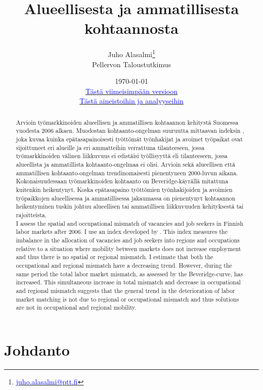 \documentclass[12pt]{article}
\title{Alueellisesta ja ammatillisesta kohtaannosta}
\date{\monthyeardate\today  \\ 
\href{https://github.com/pttry/kohtaantoindeksit/blob/main/text/kohtaantoindeksit.pdf}{\textcolor{blue}{Tästä viimeisimpään versioon}} \\
\href{https://github.com/pttry/kohtaantoindeksit}{\textcolor{blue}{Tästä aineistoihin ja analyyseihin}}}
\author{Juho Alasalmi\footnote{\href{mailto: juho.alasalmi@ptt.fi}{\textcolor{blue}{juho.alasalmi@ptt.fi}}} \\ 
Pellervon Taloustutkimus }
\begin{document}
\maketitle

\begin{abstract}
Arvioin työmarkkinoiden alueellisen ja ammatillisen kohtaannon kehitystä Suomessa vuodesta 2006 alkaen. Muodostan kohtaanto-ongelman suuruutta mittaavan indeksin \cite{csahin2014mismatch}, joka kuvaa kuinka epätasapainoisesti työttömät työnhakijat ja avoimet työpaikat ovat sijoittuneet eri alueille ja eri ammatteihin verrattuna tilanteeseen, jossa työmarkkinoiden välinen liikkuvuus ei edistäisi työllisyyttä eli tilanteeseen, jossa alueellista ja ammatillista kohtaanto-ongelmaa ei olisi. Arvioin sekä alueellisen että ammatillisen kohtaanto-ongelman trendinomaisesti pienentyneen 2000-luvun aikana. Kokonaisuudessaan työmarkkinoiden kohtaanto on Beveridge-käyrällä mitattuna kuitenkin heikentynyt. Koska epätasapaino työttömien työnhakijoiden ja avoimien työpaikkojen alueellisessa ja ammatillisessa jakaumassa on pienentynyt kohtaannon heikentyminen tuskin johtuu alueellisen tai ammatillisen liikkuvuuden kehityksestä tai rajoitteista. \\

I assess the spatial and occupational mismatch of vacancies and job seekers in Finnish labor markets after 2006. I use an index developed by \cite{csahin2014mismatch}. This index measures the imbalance in the allocation of vacancies and job seekers into regions and occupations relative to a situation where mobility between markets does not increase employment and thus there is no spatial or regional mismatch. I estimate that both the occupational and regional mismatch have a decreasing trend. However, during the same period the total labor market mismatch, as assessed by the Beveridge-curve, has increased. This simultaneous increase in total mismatch and decrease in occupational and regional mismatch suggests that the general trend in the deterioration of labor market matching is not due to regional or occupational mismatch and thus solutions are not in occupational and regional mobility.
\end{abstract}

\newpage
{}

\section{Johdanto} \label{section:johdanto}
\end{document}
